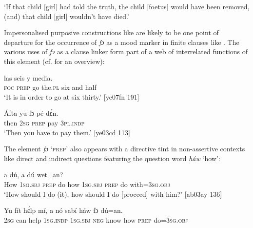 \glt ‘If that child [girl] had told the truth, the child [foetus] would have been removed, 
(and) that child [girl] wouldn’t have died.’\textstylePichiglossZchn{ [ab03ay 121]}
\z

Impersonalised purposive constructions like  are likely to be one point of departure for the occurrence of \textit{fɔ} as a mood marker in finite clauses like . The various uses of \textit{fɔ} as a clause linker form part of a web of interrelated functions of this element (cf.  for an overview): 


\ea%
    \label{ex:key:417}
    \gll {}      las    seis  y  media.\\
\textsc{foc}  \textsc{prep}  go  the\textsc{.pl}  six  and  half\\

\glt ‘It is in order to go at six thirty.’ [ye07fn 191]
\z


\ea%
    \label{ex:key:418}
    \gll \'{A}fta    yu  fɔ  pé  dɛ́n.\\
then  \textsc{2sg}  \textsc{prep}  pay  \textsc{3pl.indp}\\

\glt ‘Then you have to pay them.’ [ye03cd 113]
\z

The element \textit{fɔ} ‘\textsc{prep}’ also appears with a directive tint in non-assertive contexts like direct\textit{}  and indirect  questions featuring the question word \textit{háw} ‘how’: 


\ea%
    \label{ex:key:419}
    \gll {}  a     dú,      a     dú  wet=an?\\
How    \textsc{1sg.sbj}  \textsc{prep}  do  how    \textsc{1sg.sbj}  \textsc{prep}  do  with=\textsc{3sg.obj}\\

\glt ‘How should I do (it), how should I do [proceed] with him?’ [ab03ay 136]
\z


\ea%
    \label{ex:key:420}
    \gll Yu  fít  hɛ́lp    mí,    a    nó  sabí    háw    fɔ  dú=an.\\
\textsc{2sg}  can  help    \textsc{1sg.indp}  \textsc{1sg.sbj}  \textsc{neg}  know  how    \textsc{prep}  do=\textsc{3sg.obj}\\

